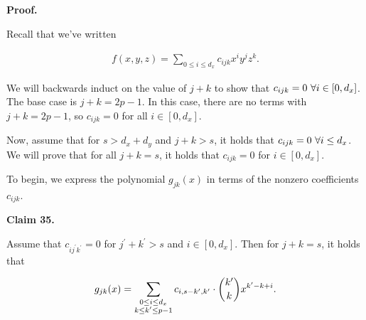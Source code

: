 



\par\medskip\noindent\textbf{Proof.}\par




Recall that we’ve written\par


\[\begin{gathered}
f(x,y,z)=\sum_{0\leq i\leq d_{x}}c_{ijk}x^{i}y^{j}z^{k}.
\end{gathered}\]


We will backwards induct on the value of $j+k$ to show that $c_{ijk}=0\nobreak\ \forall i\in[0,d_{x}]$. The base case is $j+k=2p-1$. In this case, there are no terms with $j+k=2p-1$, so $c_{ijk}=0$ for all $i\in[0,d_{x}]$.\par




Now, assume that for $s>d_{x}+d_{y}$ and $j+k>s$, it holds that $c_{ijk}=0\nobreak\ \forall i\leq d_{x}$. We will prove that for all $j+k=s$, it holds that $c_{ijk}=0$ for $i\in[0,d_{x}]$.\par




To begin, we express the polynomial $g_{jk}(x)$ in terms of the nonzero coefficients $c_{ijk}$.\par





\par\medskip\noindent\textbf{
Claim 35. 
}\par



Assume that $c_{ij^{\prime}k^{\prime}}=0$ for $j^{\prime}+k^{\prime}>s$ and $i\in[0,d_{x}]$. Then for $j+k=s$, it holds that\par


\[\begin{gathered}
g_{jk}(x)=\sum_{\begin{subarray}{c}0\leq i\leq d_{x}\\
k\leq k^{\prime}\leq p-1\end{subarray}}c_{i,s-k^{\prime},k^{\prime}}\cdot\binom{k^{\prime}}{k}x^{k^{\prime}-k+i}.
\end{gathered}\]







